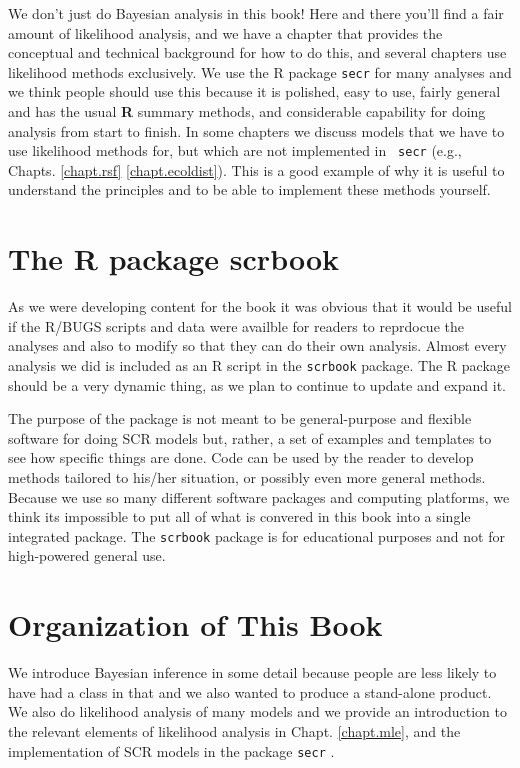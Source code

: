 We don't just do Bayesian analysis in this book! Here and there you'll
find a fair amount of likelihood analysis, and we have a chapter that
provides the conceptual and technical background for how to do this,
and several chapters use likelihood methods exclusively. We use the R
package \mbox{\tt secr} \citep{efford_etal:2009euring} for many
analyses and we think people should use this because it is polished,
easy to use, fairly general and has the usual {\bf R} summary methods,
and considerable capability for doing analysis from start to
finish. In some chapters we discuss models that we have to use
likelihood methods for, but which are not implemented in \mbox{\tt
  secr} (e.g., Chapts. \ref{chapt.rsf} \ref{chapt.ecoldist}). This is
a good example of why it is useful to understand the principles and to
be able to implement these methods yourself.

\section*{The R package scrbook}

As we were developing content for the book it was obvious that it
would be useful if the R/BUGS scripts and data were availble for
readers to reprdocue the analyses and also to modify so that they can
do their own analysis.  Almost every analysis we did is included as an
R script in the \mbox{\tt scrbook} package.
The R package should be a very dynamic thing, as we plan to
continue to update and expand it.

The purpose of the package is not meant to be general-purpose and
flexible software for doing SCR models but, rather, a set of examples
and templates to see how specific things are done. Code can be used
by the reader to develop methods tailored to his/her situation, or
possibly even more general methods.  Because we use so many different
software packages and computing platforms, we think its impossible to
put all of what is convered in this book into a single integrated
package.  The \mbox{\tt scrbook} package is for educational purposes
and not for high-powered general use.


\section*{Organization of This Book}

We introduce Bayesian inference in some
detail because people are less likely to have had a class in that and
we also wanted to produce a stand-alone product.   We also do
likelihood analysis of many models and we provide an introduction to
the relevant elements of likelihood analysis in
Chapt. \ref{chapt.mle}, and the 
implementation of SCR models in the package \mbox{\tt secr} \citep{efford_etal:2009euring}.

